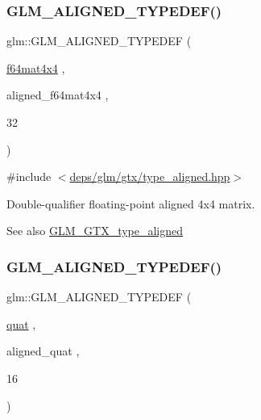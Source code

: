 \subsubsection{\texorpdfstring{G\+L\+M\+\_\+\+A\+L\+I\+G\+N\+E\+D\+\_\+\+T\+Y\+P\+E\+D\+E\+F()}{GLM\_ALIGNED\_TYPEDEF()}\hspace{0.1cm}{\footnotesize\ttfamily [204/209]}}
{\footnotesize\ttfamily glm\+::\+G\+L\+M\+\_\+\+A\+L\+I\+G\+N\+E\+D\+\_\+\+T\+Y\+P\+E\+D\+EF (\begin{DoxyParamCaption}\item[{\hyperlink{group__gtc__type__precision_ga5fc21633b1546e4599609c47b4c8dac4}{f64mat4x4}}]{,  }\item[{aligned\+\_\+f64mat4x4}]{,  }\item[{32}]{ }\end{DoxyParamCaption})}



{\ttfamily \#include $<$\hyperlink{gtx_2type__aligned_8hpp}{deps/glm/gtx/type\+\_\+aligned.\+hpp}$>$}

Double-\/qualifier floating-\/point aligned 4x4 matrix. \begin{DoxySeeAlso}{See also}
\hyperlink{group__gtx__type__aligned}{G\+L\+M\+\_\+\+G\+T\+X\+\_\+type\+\_\+aligned} 
\end{DoxySeeAlso}
\mbox{\label{group__gtx__type__aligned_gafd945a8ea86b042aba410e0560df9a3d}} 
\subsubsection{\texorpdfstring{G\+L\+M\+\_\+\+A\+L\+I\+G\+N\+E\+D\+\_\+\+T\+Y\+P\+E\+D\+E\+F()}{GLM\_ALIGNED\_TYPEDEF()}\hspace{0.1cm}{\footnotesize\ttfamily [205/209]}}
{\footnotesize\ttfamily glm\+::\+G\+L\+M\+\_\+\+A\+L\+I\+G\+N\+E\+D\+\_\+\+T\+Y\+P\+E\+D\+EF (\begin{DoxyParamCaption}\item[{\hyperlink{fwd_8hpp_ac1f6a5957091b849730ea6f05a6b7ad6}{quat}}]{,  }\item[{aligned\+\_\+quat}]{,  }\item[{16}]{ }\end{DoxyParamCaption})}



